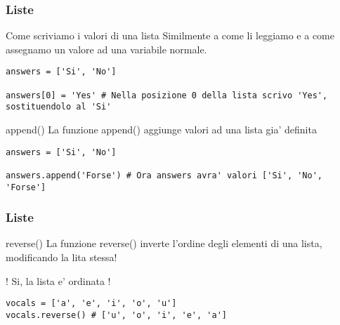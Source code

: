 \begin{frame}[fragile]
\frametitle{Liste}
    \begin{block}{Come scriviamo i valori di una lista}
Similmente a come li leggiamo e a come assegnamo un valore ad una variabile normale.
    \end{block}
    
    \begin{lstlisting}
answers = ['Si', 'No']

answers[0] = 'Yes' # Nella posizione 0 della lista scrivo 'Yes', sostituendolo al 'Si'
    \end{lstlisting}

    \begin{block}{append()}
La funzione append() aggiunge valori ad una lista gia' definita
    \end{block}

    \begin{lstlisting}
answers = ['Si', 'No']

answers.append('Forse') # Ora answers avra' valori ['Si', 'No', 'Forse']
    \end{lstlisting}

\end{frame}

\begin{frame}[fragile]
\frametitle{Liste}
    \begin{block}{reverse()}
La funzione reverse() inverte l'ordine degli elementi di una lista, modificando la lita stessa!

! Si, la lista e' ordinata !
    \end{block}

    \begin{lstlisting}
vocals = ['a', 'e', 'i', 'o', 'u']
vocals.reverse() # ['u', 'o', 'i', 'e', 'a']
    \end{lstlisting}

\end{frame}

